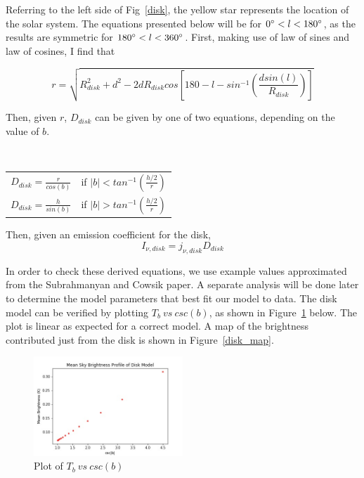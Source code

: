 \documentclass[letterpaper, 10pt]{article}
\begin{document}
Referring to the left side of Fig~\ref{disk}, the yellow star represents the location of the solar system. The equations presented below will be for $ 0\degree < l < 180\degree $, as the results are symmetric for $ 180\degree < l < 360\degree $. First, making use of law of sines and law of cosines, I find that 

\[ r = \sqrt{R_{disk}^{2} + d^{2} - 2dR_{disk}cos\left[180 - l - sin^{-1}\left(\frac{dsin(l)}{R_{disk}}\right)\right]} \]

Then, given $r$, $D_{disk}$ can be given by one of two equations, depending on the value of $b$. 

\begin{table}[h]\
\centering
\begin{tabular}{c c}
$ D_{disk} = \frac{r}{cos(b)} $ & if $|b| < tan^{-1} \left(\frac{h/2}{r} \right)$ \\

$ D_{disk} = \frac{h}{sin(b)} $ & if $|b| > tan^{-1} \left(\frac{h/2}{r} \right)$ \\

\end{tabular}
\end{table}

Then, given an emission coefficient for the disk, 
\[I_{\nu, disk} = j_{\nu, disk}D_{disk} \]

In order to check these derived equations, we use example values approximated from the Subrahmanyan and Cowsik paper. A separate analysis will be done later to determine the model parameters that best fit our model to data. The disk model can be verified by plotting $ T_{b}\ vs\ csc(b)$, as shown in Figure~\ref{cscb} below. The plot is linear as expected for a correct model. A map of the brightness contributed just from the disk is shown in Figure~\ref{disk_map}.

\begin{figure}[h]
\begin{center}
\includegraphics[width=0.5\textwidth]{cscb.jpg}
\caption{Plot of $ T_{b}\ vs\ csc(b)$}
\label{cscb}
\end{center}
\end{figure}
\end{document}
